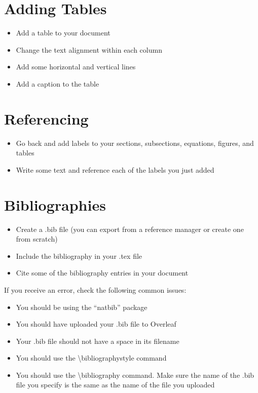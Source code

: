 \documentclass[11pt,a4paper]{article}
\begin{document}
\section{Adding Tables}
\begin{itemize}
\item Add a table to your document
\item Change the text alignment within each column
\item Add some horizontal and vertical lines
\item Add a caption to the table
\end{itemize}

\section{Referencing}
\begin{itemize}
\item Go back and add labels to your sections, subsections, equations, figures, and tables
\item Write some text and reference each of the labels you just added
\end{itemize}

\section{Bibliographies}
\begin{itemize}
\item Create a .bib file (you can export from a reference manager or create one from scratch)
\item Include the bibliography in your .tex file
\item Cite some of the bibliography entries in your document
\end{itemize}

If you receive an error, check the following common issues:

\begin{itemize}
\item You should be using the ``natbib'' package
\item You should have uploaded your .bib file to Overleaf
\item Your .bib file should not have a space in its filename
\item You should use the \textbackslash bibliographystyle command
\item You should use the \textbackslash  bibliography command. Make sure the name of the .bib file you specify is the same as the name of the file you uploaded
\end{itemize}
\end{document}
